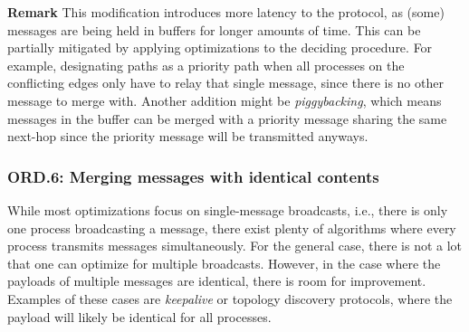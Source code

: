 \textbf{Remark}
This modification introduces more latency to the protocol, 
as (some) messages are being held in buffers for longer amounts of time. This can be partially mitigated by applying optimizations to the deciding procedure. For example, designating paths as a priority path when all processes on the conflicting edges only have to relay that single message, since there is no other message to merge with. Another addition might be \textit{piggybacking}, which means messages in the buffer can be merged with a priority message sharing the same next-hop since the priority message will be transmitted anyways.






\subsubsection{ORD.6: Merging messages with identical contents}
While most optimizations focus on single-message broadcasts, i.e., there is only one process broadcasting a message, there exist plenty of algorithms where every process transmits messages simultaneously. For the general case, there is not a lot that one can optimize for multiple broadcasts. However, in the case where the payloads of multiple messages are identical, there is room for improvement. Examples of these cases are \textit{keepalive} or topology discovery protocols, where the payload will likely be identical for all processes. 


